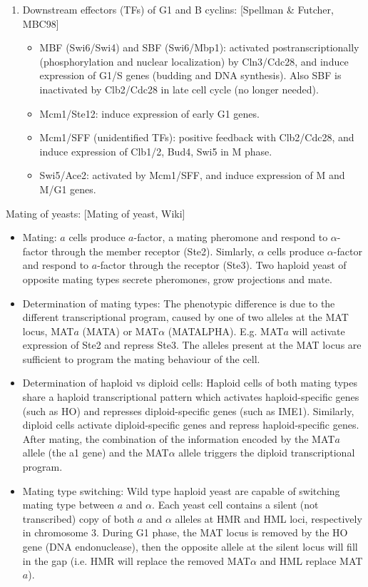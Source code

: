\documentclass{report}
\begin{document}
\begin{enumerate}
	\item Downstream effectors (TFs) of G1 and B cyclins: [Spellman \& Futcher, MBC98]
	\begin{itemize}
		\item MBF (Swi6/Swi4) and SBF (Swi6/Mbp1): activated postranscriptionally (phosphorylation and nuclear localization) by Cln3/Cdc28, and induce expression of G1/S genes (budding and DNA synthesis). Also SBF is inactivated by Clb2/Cdc28 in late cell cycle (no longer needed). 
		\item Mcm1/Ste12: induce expression of early G1 genes. 
		\item Mcm1/SFF (unidentified TFs): positive feedback with Clb2/Cdc28, and induce expression of Clb1/2, Bud4, Swi5 in M phase. 
		\item Swi5/Ace2: activated by Mcm1/SFF, and induce expression of M and M/G1 genes. 
	\end{itemize}
\end{enumerate}

Mating of yeasts: [Mating of yeast, Wiki]
\begin{itemize}
	\item Mating: $a$ cells produce $a$-factor, a mating pheromone and respond to $\alpha$-factor through the member receptor (Ste2). Simlarly, $\alpha$ cells produce $\alpha$-factor and respond to $a$-factor through the receptor (Ste3). Two haploid yeast of opposite mating types secrete pheromones, grow projections and mate.
	\item Determination of mating types: The phenotypic difference is due to the different transcriptional program, caused by one of two alleles at the MAT locus, MAT$a$ (MATA) or MAT$\alpha$ (MATALPHA). E.g. MAT$a$ will activate expression of Ste2 and repress Ste3. The alleles present at the MAT locus are sufficient to program the mating behaviour of the cell. 
	\item Determination of haploid vs diploid cells: Haploid cells of both mating types share a haploid transcriptional pattern which activates haploid-specific genes (such as HO) and represses diploid-specific genes (such as IME1). Similarly, diploid cells activate diploid-specific genes and repress haploid-specific genes. After mating, the combination of the information encoded by the MAT$a$ allele (the a1 gene) and the MAT$\alpha$ allele triggers the diploid transcriptional program.
	\item Mating type switching: Wild type haploid yeast are capable of switching mating type between $a$ and $\alpha$. Each yeast cell contains a silent (not transcribed) copy of both $a$ and $\alpha$ alleles at HMR and HML loci, respectively in chromosome 3. During G1 phase, the MAT locus is removed by the HO gene (DNA endonuclease), then the opposite allele at the silent locus will fill in the gap (i.e. HMR will replace the removed MAT$\alpha$ and HML replace MAT$a$). 
\end{itemize}
\end{document}
